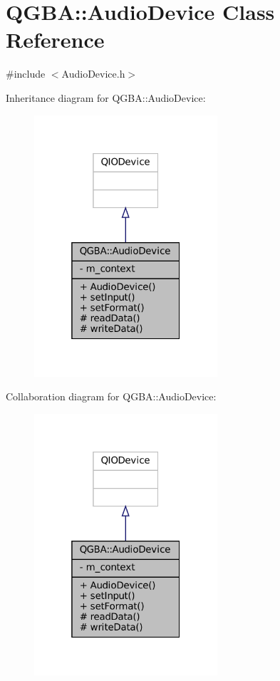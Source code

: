 \hypertarget{class_q_g_b_a_1_1_audio_device}{}\section{Q\+G\+BA\+:\+:Audio\+Device Class Reference}
\label{class_q_g_b_a_1_1_audio_device}


{\ttfamily \#include $<$Audio\+Device.\+h$>$}



Inheritance diagram for Q\+G\+BA\+:\+:Audio\+Device\+:
\nopagebreak
\begin{figure}[H]
\begin{center}
\leavevmode
\includegraphics[width=193pt]{class_q_g_b_a_1_1_audio_device__inherit__graph}
\end{center}
\end{figure}


Collaboration diagram for Q\+G\+BA\+:\+:Audio\+Device\+:
\nopagebreak
\begin{figure}[H]
\begin{center}
\leavevmode
\includegraphics[width=193pt]{class_q_g_b_a_1_1_audio_device__coll__graph}
\end{center}
\end{figure}
